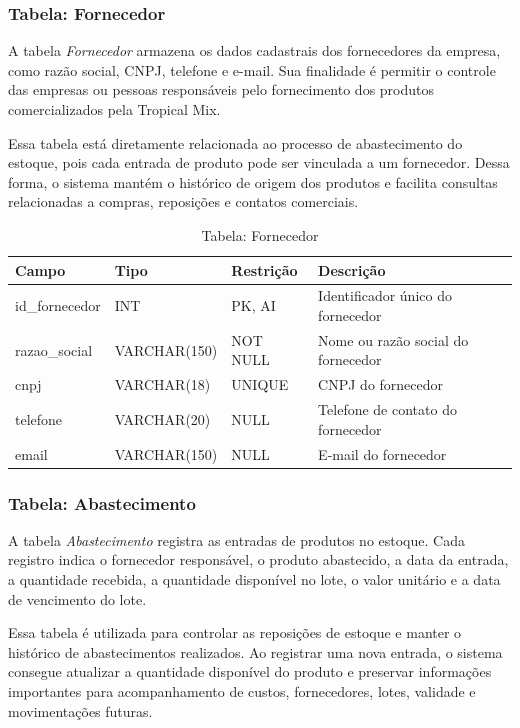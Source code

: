 \subsubsection{Tabela: Fornecedor}

A tabela \textit{Fornecedor} armazena os dados cadastrais dos fornecedores da empresa, como razão social, CNPJ, telefone e e-mail. Sua finalidade é permitir o controle das empresas ou pessoas responsáveis pelo fornecimento dos produtos comercializados pela Tropical Mix.

Essa tabela está diretamente relacionada ao processo de abastecimento do estoque, pois cada entrada de produto pode ser vinculada a um fornecedor. Dessa forma, o sistema mantém o histórico de origem dos produtos e facilita consultas relacionadas a compras, reposições e contatos comerciais.

\begin{table}[H]
\centering
\begin{tabular}{|p{3cm}|p{3cm}|p{3cm}|p{5cm}|}
\hline
\textbf{Campo} & \textbf{Tipo} & \textbf{Restrição} & \textbf{Descrição} \\ \hline
id\_fornecedor & INT & PK, AI & Identificador único do fornecedor \\ \hline
razao\_social & VARCHAR(150) & NOT NULL & Nome ou razão social do fornecedor \\ \hline
cnpj & VARCHAR(18) & UNIQUE & CNPJ do fornecedor \\ \hline
telefone & VARCHAR(20) & NULL & Telefone de contato do fornecedor \\ \hline
email & VARCHAR(150) & NULL & E-mail do fornecedor \\ \hline
\end{tabular}
\caption{Tabela: Fornecedor}
\end{table}

\subsubsection{Tabela: Abastecimento}

A tabela \textit{Abastecimento} registra as entradas de produtos no estoque. Cada registro indica o fornecedor responsável, o produto abastecido, a data da entrada, a quantidade recebida, a quantidade disponível no lote, o valor unitário e a data de vencimento do lote.

Essa tabela é utilizada para controlar as reposições de estoque e manter o histórico de abastecimentos realizados. Ao registrar uma nova entrada, o sistema consegue atualizar a quantidade disponível do produto e preservar informações importantes para acompanhamento de custos, fornecedores, lotes, validade e movimentações futuras.

